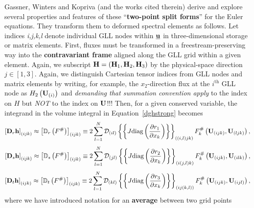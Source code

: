 Gassner, Winters and Kopriva\cite{splitformnodaldg} (and the works cited therein)
derive and explore several properties and features of these
``\textbf{two-point split forms}'' for the Euler equations. They transform them
to deformed spectral elements as follows.
Let indices \emph{i,j,k,l} denote individual GLL nodes within ${\underline {\bf u}}$ in three-dimensional storage or matrix elements.
First, fluxes must be transformed in a freestream-preserving way into the
\textbf{contravariant frame} aligned along the GLL grid within a given element.
Again, we subscript ${\bf H}=\left({\bf H}_1,{\bf H}_2,{\bf H}_3\right)$ by the physical-space
direction $j\in[1,3]$. Again, we distinguish Cartesian tensor indices from GLL
nodes and matrix elements by writing, for example, the $x_2$-direction flux at
the $i^{\mbox{th}}$ GLL node as $H_2\left({\bf U}_{(i)}\right)$ and \emph{demanding
that summation convention apply} to the index on $H$ but \emph{NOT} to the
index on ${\bf U}$!!!
Then, for a given conserved variable, the integrand in the volume integral in Equation~\ref{dghstrong} becomes
\begin{equation}
\left[\mathbf{D}_r\mathbf{h}\right]_{(ijk)}\approx
\left[\mathbb{D}_r\left(F^{\#}\right)\right]_{(ijk)}\equiv
2\sum_{l=1}^N\mathcal{D}_{(il)}
\left\{\left\{J\mbox{diag}\left(\frac{\partial r_1}{\partial x_k}\right)\right\}\right\}_{((i,l)jk)}F^{\#}_k\left({\bf U}_{(ijk)},{\bf U}_{(ljk)}\right),
\label{splitr}
\end{equation}
\begin{equation}
\left[\mathbf{D}_s\mathbf{h}\right]_{(ijk)}\approx
\left[\mathbb{D}_s\left(F^{\#}\right)\right]_{(ijk)}\equiv
2\sum_{l=1}^N\mathcal{D}_{(jl)}
\left\{\left\{J\mbox{diag}\left(\frac{\partial r_2}{\partial x_k}\right)\right\}\right\}_{(i(j,l)k)}F^{\#}_k\left({\bf U}_{(ijk)},{\bf U}_{(ilk)}\right),
\label{splits}
\end{equation}
\begin{equation}
\left[\mathbf{D}_t\mathbf{h}\right]_{(ijk)}\approx
\left[\mathbb{D}_t\left(F^{\#}\right)\right]_{(ijk)}\equiv
2\sum_{l=1}^N\mathcal{D}_{(kl)}
\left\{\left\{J\mbox{diag}\left(\frac{\partial r_3}{\partial x_k}\right)\right\}\right\}_{(ij(k,l))}F^{\#}_k\left({\bf U}_{(ijk)},{\bf U}_{(ijl)}\right),
\label{splitt}
\end{equation}
where we have introduced notation for an \textbf{average} between two grid points
